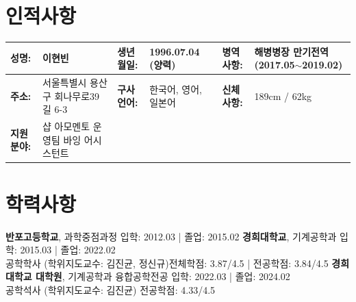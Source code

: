 \documentclass[a4paper,10pt]{extarticle}
\begin{document}
\renewcommand*{\arraystretch}{1.5}
\noindent
\section*{인적사항}
\begin{center}
	\vspace*{-0.8cm}
	\noindent
	\begin{longtable}{LRLRLR}
		\textbf{성명:}   & 이현빈                   & \textbf{생년월일:} & 1996.07.04 (양력) & \textbf{병역사항:}  & 해병병장 만기전역 \small{(2017.05$\sim$2019.02)} \\
		\hline
		\textbf{주소:}   & 서울특별시 용산구 회나무로39길 6-3 & \textbf{구사언어:} & 한국어, 영어, 일본어    & \textbf{신체사항: } & 189cm / 62kg                             \\
		\hline
		\textbf{지원분야:} & {샵 아모멘토 운영팀 바잉 어시스턴트}
	\end{longtable}
\end{center}



\section*{학력사항}
\noindent
\textbf{반포고등학교}, 과학중점과정 \hfill 입학: 2012.03 | 졸업: 2015.02
\newline
\textbf{경희대학교}, 기계공학과 \hfill 입학: 2015.03 | 졸업: 2022.02\\ %
공학학사 (학위지도교수: 김진균, 정신규)\hfill 전체학점: 3.87/4.5 | 전공학점: 3.84/4.5 %
\newline
\textbf{경희대학교 대학원}, 기계공학과 융합공학전공 \hfill 입학: 2022.03 | 졸업: 2024.02\\ %
공학석사 (학위지도교수: 김진균) \hfill 전공학점: 4.33/4.5 %
\end{document}

